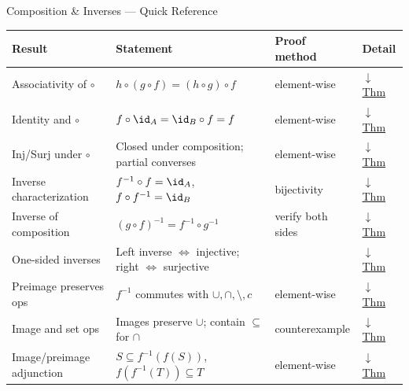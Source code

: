 

\begin{toolkitbox}{Composition \& Inverses --- Quick Reference}
\small
\begin{tabular}{l l l l}
\toprule
\textbf{Result} & \textbf{Statement} & \textbf{Proof method} & \textbf{Detail} \\
\midrule
Associativity of $\circ$ & $h \circ (g \circ f) = (h \circ g) \circ f$ & element-wise & \hyperref[thm:comp-assoc]{$\downarrow$ Thm} \\
Identity and $\circ$     & $f \circ \id_A = \id_B \circ f = f$          & element-wise & \hyperref[thm:comp-id]{$\downarrow$ Thm} \\
Inj/Surj under $\circ$   & Closed under composition; partial converses  & element-wise & \hyperref[thm:comp-inj-surj]{$\downarrow$ Thm} \\
Inverse characterization & $f^{-1}\circ f = \id_A$, $f \circ f^{-1} = \id_B$ & bijectivity & \hyperref[thm:inverse-char]{$\downarrow$ Thm} \\
Inverse of composition   & $(g \circ f)^{-1} = f^{-1} \circ g^{-1}$    & verify both sides & \hyperref[thm:inverse-comp]{$\downarrow$ Thm} \\
One-sided inverses       & Left inverse $\iff$ injective; right $\iff$ surjective & & \hyperref[thm:one-sided]{$\downarrow$ Thm} \\
Preimage preserves ops   & $f^{-1}$ commutes with $\cup,\cap,\setminus,c$ & element-wise & \hyperref[thm:preimage-ops]{$\downarrow$ Thm} \\
Image and set ops        & Images preserve $\cup$; contain $\subseteq$ for $\cap$ & counterexample & \hyperref[thm:image-ops]{$\downarrow$ Thm} \\
Image/preimage adjunction & $S\subseteq f^{-1}(f(S))$, $f(f^{-1}(T))\subseteq T$ & element-wise & \hyperref[thm:image-preimage-adjunction]{$\downarrow$ Thm} \\
\bottomrule
\end{tabular}
\end{toolkitbox}


